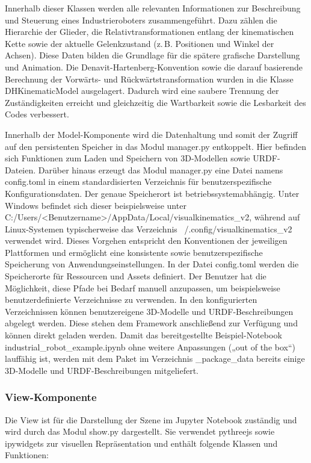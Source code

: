 Innerhalb dieser Klassen werden alle relevanten Informationen zur Beschreibung und Steuerung eines Industrieroboters zusammengeführt.  
Dazu zählen die Hierarchie der Glieder, die Relativtransformationen entlang der kinematischen Kette sowie der aktuelle Gelenkzustand (z.\,B. Positionen und Winkel der Achsen).  
Diese Daten bilden die Grundlage für die spätere grafische Darstellung und Animation.
Die Denavit-Hartenberg-Konvention sowie die darauf basierende Berechnung der Vorwärts- und Rückwärtstransformation wurden in die Klasse DHKinematicModel ausgelagert.
Dadurch wird eine saubere Trennung der Zuständigkeiten erreicht und gleichzeitig die Wartbarkeit sowie die Lesbarkeit des Codes verbessert.

Innerhalb der Model-Komponente wird die Datenhaltung und somit der Zugriff auf den persistenten Speicher in das Modul manager.py entkoppelt.
Hier befinden sich Funktionen zum Laden und Speichern von 3D-Modellen sowie URDF-Dateien.
Darüber hinaus erzeugt das Modul manager.py eine Datei namens config.toml in einem standardisierten Verzeichnis für benutzerspezifische Konfigurationsdaten.
Der genaue Speicherort ist betriebssystemabhängig. Unter Windows befindet sich dieser beispielsweise unter
C:/Users/\textless{}Benutzername\textgreater{}/AppData/Local/visualkinematics\_v2,
während auf Linux-Systemen typischerweise das Verzeichnis
~/.config/visualkinematics\_v2 verwendet wird.
Dieses Vorgehen entspricht den Konventionen der jeweiligen Plattformen und ermöglicht eine konsistente sowie benutzerspezifische Speicherung von Anwendungseinstellungen.
In der Datei config.toml werden die Speicherorte für Ressourcen und Assets definiert. Der Benutzer hat die Möglichkeit,
diese Pfade bei Bedarf manuell anzupassen, um beispielsweise benutzerdefinierte Verzeichnisse zu verwenden.
In den konfigurierten Verzeichnissen können benutzereigene 3D-Modelle und URDF-Beschreibungen abgelegt werden.
Diese stehen dem Framework anschließend zur Verfügung und können direkt geladen werden.
Damit das bereitgestellte Beispiel-Notebook industrial\_robot\_ex\-am\-ple.ipynb ohne weitere Anpassungen („out of the box“) lauffähig ist,
werden mit dem Paket im Verzeichnis \_package\_data bereits einige 3D-Modelle und URDF-Be\-schrei\-bun\-gen mitgeliefert.


\subsubsection{View-Komponente}
Die View ist für die Darstellung der Szene im Jupyter Notebook zuständig und wird durch das Modul show.py dargestellt.
Sie verwendet pythreejs sowie ipywidgets zur visuellen Repräsentation und enthält folgende Klassen und Funktionen:

